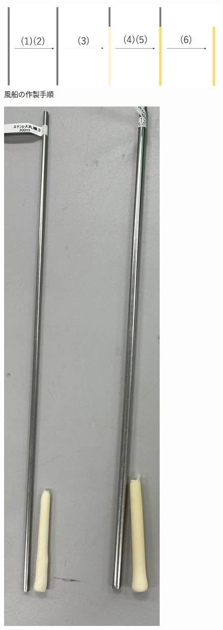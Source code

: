 \begin{figure}[!h]
  \centering  %
  \includegraphics[scale=0.35]{pic/tezyun.PNG}
  \caption{風船の作製手順}
  \label{fig:4}
\end{figure}
\begin{figure}[!t]
  \centering  %
  \includegraphics[scale=0.28]{pic/balloon.jpg}

\end{figure}
